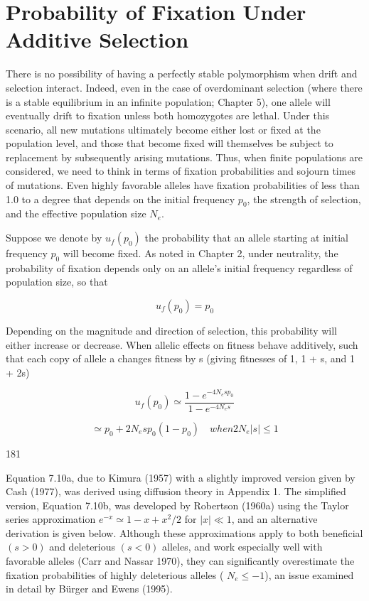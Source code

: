 \documentclass{article}
\begin{document}
\section{Probability of Fixation Under Additive Selection}
There is no possibility of having a perfectly stable polymorphism when drift and selection interact. Indeed, even in the case of overdominant selection (where there is a stable equilibrium in an infinite population; Chapter 5), one allele will eventually drift to fixation unless both homozygotes are lethal. Under this scenario, all new mutations ultimately become either lost or fixed at the population level, and those that become fixed will themselves be subject to replacement by subsequently arising mutations. Thus, when finite populations are considered, we need to think in terms of fixation probabilities and sojourn times of mutations. Even highly favorable alleles have fixation probabilities of less than 1.0 to a degree that depends on the initial frequency  $ p_0 $, the strength of selection, and the effective population size  $ N_e $.

Suppose we denote by  $ u_f(p_0) $ the probability that an allele starting at initial frequency  $ p_0 $ will become fixed. As noted in Chapter 2, under neutrality, the probability of fixation depends only on an allele's initial frequency regardless of population size, so that

\begin{equation}
u_{f}(p_{0})=p_{0}
\tag{7.9}
\label{eq:7_9}
\end{equation}

Depending on the magnitude and direction of selection, this probability will either increase or decrease. When allelic effects on fitness behave additively, such that each copy of allele a changes fitness by s (giving fitnesses of 1, 1 + s, and 1 + 2s)

\begin{equation}
u_{f}(p_{0})\simeq\frac{1-e^{-4N_{e}sp_{0}}}{1-e^{-4N_{e}s}}
\tag{7.10a}
\label{eq:7_10a}
\end{equation}

\begin{equation}
\simeq p_{0}+2N_{e}sp_{0}(1-p_{0})\quad when2N_{e}|s|\leq1
\tag{7.10b}
\label{eq:7_10b}
\end{equation}

181

Equation 7.10a, due to Kimura (1957) with a slightly improved version given by Cash (1977), was derived using diffusion theory in Appendix 1. The simplified version, Equation 7.10b, was developed by Robertson (1960a) using the Taylor series approximation  $ e^{-x} \simeq 1 - x + x^2 / 2 $ for  $ |x| \ll 1 $, and an alternative derivation is given below. Although these approximations apply to both beneficial  $ (s > 0) $ and deleterious  $ (s < 0) $ alleles, and work especially well with favorable alleles (Carr and Nassar 1970), they can significantly overestimate the fixation probabilities of highly deleterious alleles ( $ N_e \leq -1 $), an issue examined in detail by Bürger and Ewens (1995).
\end{document}
